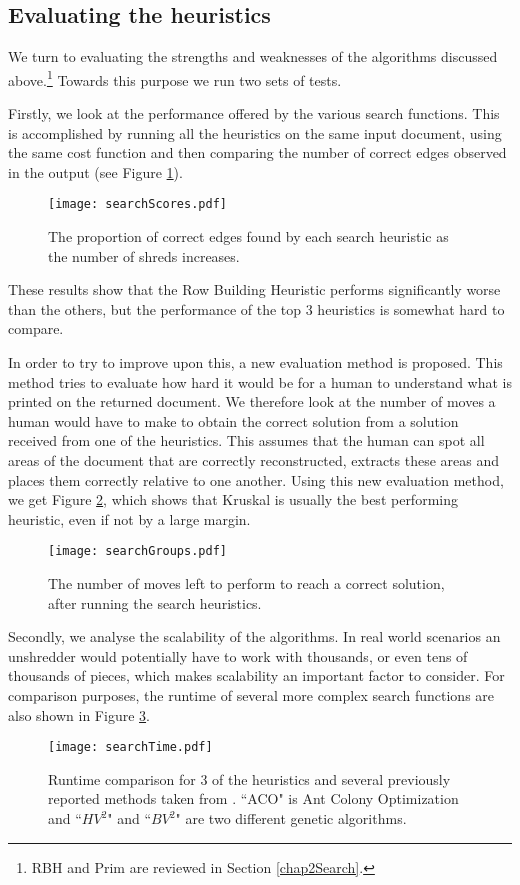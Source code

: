 \subsection{Evaluating the heuristics}
\label{chap5Eval}
We turn to evaluating the strengths and weaknesses of the algorithms discussed above.\footnote{RBH and Prim are reviewed in Section \ref{chap2Search}.} Towards this purpose we run two sets of tests. 

Firstly, we look at the performance offered by the various search functions. This is accomplished by running all the heuristics on the same input document, using the same cost function and then comparing the number of correct edges observed in the output (see Figure \ref{fig:searchScore}). 
\begin{figure}[h]
  \centering
  \texttt{[image: searchScores.pdf]}
  \caption{The proportion of correct edges found by each search heuristic as the number of shreds increases.}
  \label{fig:searchScore}
\end{figure}
These results show that the Row Building Heuristic performs significantly worse than the others, but the performance of the top 3 heuristics is somewhat hard to compare. 

In order to try to improve upon this, a new evaluation method is proposed. This method tries to evaluate how hard it would be for a human to understand what is printed on the returned document. We therefore look at the number of moves a human would have to make to obtain the correct solution from a solution received from one of the heuristics. This assumes that the human can spot all areas of the document that are correctly reconstructed, extracts these areas and places them correctly relative to one another. Using this new evaluation method, we get Figure \ref{fig:searchGroups}, which shows that Kruskal is usually the best performing heuristic, even if not by a large margin.

\begin{figure}[h]
  \centering
  \texttt{[image: searchGroups.pdf]}
  \caption{The number of moves left to perform to reach a correct solution, after running the search heuristics.}
  \label{fig:searchGroups}
\end{figure}

Secondly, we analyse the scalability of the algorithms. In real world scenarios an unshredder would potentially have to work with thousands, or even tens of thousands of pieces, which makes scalability an important factor to consider. For comparison purposes, the runtime of several more complex search functions are also shown in Figure \ref{fig:searchTime}. 
\begin{figure}[h]
  \centering
  \texttt{[image: searchTime.pdf]}
  \caption{Runtime comparison for 3 of the heuristics and several previously reported methods taken from \cite{P2,P5,P7}. ``ACO" is Ant Colony Optimization and ``$HV^2$" and ``$BV^2$" are two different genetic algorithms. }
  \label{fig:searchTime}
\end{figure}

